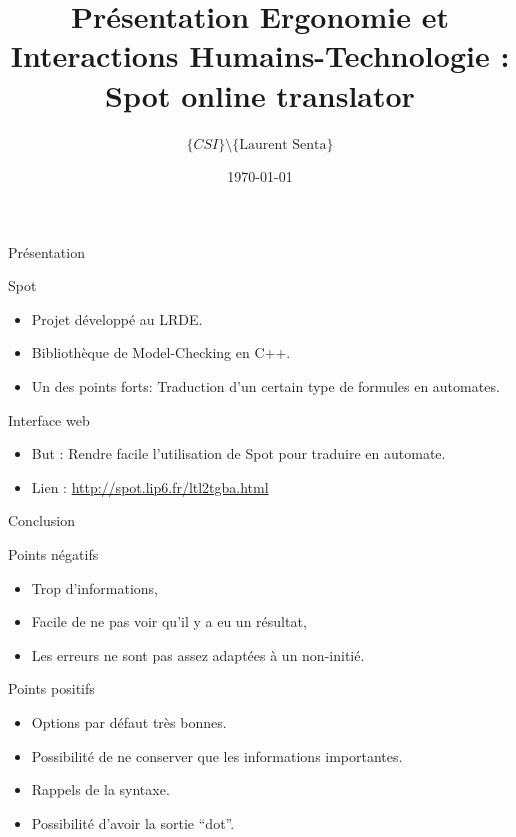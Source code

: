 \documentclass{beamer}
\author {$\{CSI\} \setminus \{\text{Laurent Senta}\}$}
\date\today
\title[Ergonomie: Spot online ]{Présentation Ergonomie et Interactions Humains-Technologie : \og Spot online translator\fg}
\institute{Epita - CSI}
\begin{document}
\begin{frame}
  \maketitle
\end{frame}


\begin{frame}{Présentation}
  \begin{block}{Spot}
    \begin{itemize}
    \item Projet développé au LRDE.
    \item Bibliothèque de Model-Checking en C++.
    \item Un des points forts: Traduction d'un certain type de formules
      en automates.
    \end{itemize}
  \end{block}

  \begin{block}{Interface web}
    \begin{itemize}
    \item But : Rendre facile l'utilisation de Spot pour traduire en
      automate.
    \item Lien : \url{http://spot.lip6.fr/ltl2tgba.html}
    \end{itemize}
  \end{block}
\end{frame}












\begin{frame}{Conclusion}
  \begin{block}{Points négatifs}
    \begin{itemize}
    \item Trop d'informations,
    \item Facile de ne pas voir qu'il y a eu un résultat,
    \item Les erreurs ne sont pas assez adaptées à un non-initié.
    \end{itemize}
  \end{block}

  \begin{block}{Points positifs}
    \begin{itemize}
    \item Options par défaut très bonnes.
    \item Possibilité de ne conserver que les informations importantes.
    \item Rappels de la syntaxe.
    \item Possibilité d'avoir la sortie ``dot''.
    \end{itemize}
  \end{block}
\end{frame}
\end{document}
